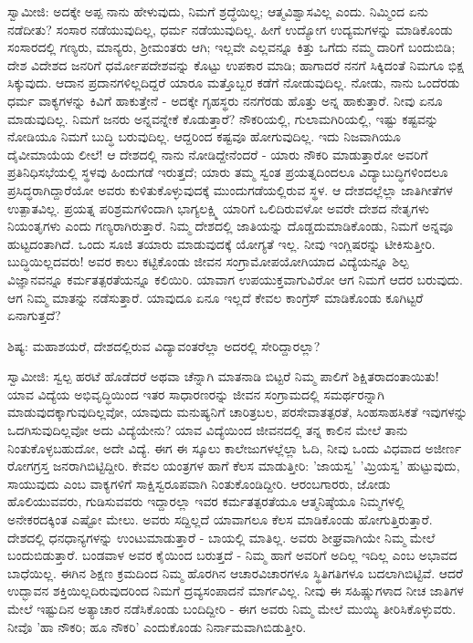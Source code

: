 ಸ್ವಾಮೀಜಿ: ಅದಕ್ಕೇ ಅಪ್ಪ ನಾನು ಹೇಳುವುದು, ನಿಮಗೆ ಶ್ರದ್ಧೆಯಿಲ್ಲ; ಆತ್ಮವಿಶ್ವಾಸವಿಲ್ಲ ಎಂದು. ನಿಮ್ಮಿಂದ ಏನು ನಡೆದೀತು? ಸಂಸಾರ ನಡೆಯುವುದಿಲ್ಲ, ಧರ್ಮ ನಡೆಯುವುದಿಲ್ಲ. ಹೀಗೆ ಉದ್ಯೋಗ ಉದ್ಯಮಗಳನ್ನು ಮಾಡಿಕೊಂಡು ಸಂಸಾರದಲ್ಲಿ ಗಣ್ಯರು, ಮಾನ್ಯರು, ಶ‍್ರೀಮಂತರು ಆಗಿ; ಇಲ್ಲವೇ ಎಲ್ಲವನ್ನೂ ಕಿತ್ತು ಒಗೆದು ನಮ್ಮ ದಾರಿಗೆ ಬಂದುಬಿಡಿ; ದೇಶ ವಿದೇಶದ ಜನರಿಗೆ ಧರ್ಮೋಪದೇಶವನ್ನು ಕೊಟ್ಟು ಉಪಕಾರ ಮಾಡಿ; ಹಾಗಾದರೆ ನನಗೆ ಸಿಕ್ಕಿದಂತೆ ನಿಮಗೂ ಭಿಕ್ಷ ಸಿಕ್ಕುವುದು. ಆದಾನ ಪ್ರದಾನಗಳಿಲ್ಲದಿದ್ದರೆ ಯಾರೂ ಮತ್ತೊಬ್ಬರ ಕಡೆಗೆ ನೋಡುವುದಿಲ್ಲ. ನೋಡು, ನಾನು ಒಂದೆರಡು ಧರ್ಮ ವಾಕ್ಯಗಳನ್ನು ಕಿವಿಗೆ ಹಾಕುತ್ತೇನೆ - ಅದಕ್ಕೇ ಗೃಹಸ್ಥರು ನನಗೆರಡು ಹೊತ್ತು ಅನ್ನ ಹಾಕುತ್ತಾರೆ. ನೀವು ಏನೂ ಮಾಡುವುದಿಲ್ಲ. ನಿಮಗೆ ಜನರು ಅನ್ನವನ್ನೇಕೆ ಕೊಡುತ್ತಾರೆ? ನೌಕರಿಯಲ್ಲಿ, ಗುಲಾಮಗಿರಿಯಲ್ಲಿ, ಇಷ್ಟು ಕಷ್ಟವನ್ನು ನೋಡಿಯೂ ನಿಮಗೆ ಬುದ್ಧಿ ಬರುವುದಿಲ್ಲ. ಆದ್ದರಿಂದ ಕಷ್ಟವೂ ಹೋಗುವುದಿಲ್ಲ. ಇದು ನಿಜವಾಗಿಯೂ ದೈವೀಮಾಯೆಯ ಲೀಲೆ! ಆ ದೇಶದಲ್ಲಿ ನಾನು ನೋಡಿದ್ದೇನೆಂದರೆ - ಯಾರು ನೌಕರಿ ಮಾಡುತ್ತಾರೋ ಅವರಿಗೆ ಪ್ರತಿನಿಧಿಸಭೆಯಲ್ಲಿ ಸ್ಥಳವು ಹಿಂದುಗಡೆ ಇರುತ್ತದೆ; ಯಾರು ತಮ್ಮ ಸ್ವಂತ ಪ್ರಯತ್ನದಿಂದಲೂ ವಿದ್ಯಾಬುದ್ಧಿಗಳಿಂದಲೂ ಪ್ರಸಿದ್ಧರಾಗಿದ್ದಾರೆಯೋ ಅವರು ಕುಳಿತುಕೊಳ್ಳುವುದಕ್ಕೆ ಮುಂದುಗಡೆಯಲ್ಲಿರುವ ಸ್ಥಳ. ಆ ದೇಶದಲ್ಲೆಲ್ಲಾ ಜಾತಿಗೀತೆಗಳ ಉತ್ಪಾತವಿಲ್ಲ. ಪ್ರಯತ್ನ ಪರಿಶ್ರಮಗಳಿಂದಾಗಿ ಭಾಗ್ಯಲಕ್ಷ್ಮಿ ಯಾರಿಗೆ ಒಲಿದಿರುವಳೋ ಅವರೇ ದೇಶದ ನೇತೃಗಳು ನಿಯಂತೃಗಳು ಎಂದು ಗಣ್ಯರಾಗಿರುತ್ತಾರೆ. ನಿಮ್ಮ ದೇಶದಲ್ಲಿ ಜಾತಿಯನ್ನು ದೊಡ್ಡದುಮಾಡಿಕೊಂಡು, ನಿಮಗೆ ಅನ್ನವೂ ಹುಟ್ಟದಂತಾಗಿದೆ. ಒಂದು ಸೂಜಿ ತಯಾರು ಮಾಡುವುದಕ್ಕೆ ಯೋಗ್ಯತೆ ಇಲ್ಲ. ನೀವು ಇಂಗ್ಲಿಷರನ್ನು ಟೀಕಿಸುತ್ತೀರಿ. ಬುದ್ಧಿಯಿಲ್ಲದವರು! ಅವರ ಕಾಲು ಕಟ್ಟಿಕೊಂಡು ಜೀವನ ಸಂಗ್ರಾಮೋಪಯೋಗಿಯಾದ ವಿದ್ಯೆಯನ್ನೂ ಶಿಲ್ಪ ವಿಜ್ಞಾನವನ್ನೂ ಕರ್ಮತತ್ಪರತೆಯನ್ನೂ ಕಲಿಯಿರಿ. ಯಾವಾಗ ಉಪಯುಕ್ತವಾಗುವಿರೋ ಆಗ ನಿಮಗೆ ಆದರ ಬರುವುದು. ಆಗ ನಿಮ್ಮ ಮಾತನ್ನು ನಡೆಸುತ್ತಾರೆ. ಯಾವುದೂ ಏನೂ ಇಲ್ಲದೆ ಕೇವಲ ಕಾಂಗ್ರೆಸ್ ಮಾಡಿಕೊಂಡು ಕೂಗಿಟ್ಟರೆ ಏನಾಗುತ್ತದೆ?

ಶಿಷ್ಯ: ಮಹಾಶಯರೆ, ದೇಶದಲ್ಲಿರುವ ವಿದ್ಯಾವಂತರೆಲ್ಲಾ ಅದರಲ್ಲಿ ಸೇರಿದ್ದಾರಲ್ಲಾ?

ಸ್ವಾಮೀಜಿ: ಸ್ವಲ್ಪ ಹರಟೆ ಹೊಡೆದರೆ ಅಥವಾ ಚೆನ್ನಾಗಿ ಮಾತನಾಡಿ ಬಿಟ್ಟರೆ ನಿಮ್ಮ ಪಾಲಿಗೆ ಶಿಕ್ಷಿತರಾದಂತಾಯಿತು! ಯಾವ ವಿದ್ಯೆಯ ಅಭಿವೃದ್ಧಿಯಿಂದ ಇತರ ಸಾಧಾರಣರನ್ನು ಜೀವನ ಸಂಗ್ರಾಮದಲ್ಲಿ ಸಮರ್ಥರನ್ನಾಗಿ ಮಾಡುವುದಕ್ಕಾಗುವುದಿಲ್ಲವೋ, ಯಾವುದು ಮನುಷ್ಯನಿಗೆ ಚಾರಿತ್ರಬಲ, ಪರಸೇವಾತತ್ಪರತೆ, ಸಿಂಹಸಾಹಸಿಕತೆ ಇವುಗಳನ್ನು ಒದಗಿಸುವುದಿಲ್ಲವೋ ಅದು ವಿದ್ಯೆಯೇನು? ಯಾವ ವಿದ್ಯೆಯಿಂದ ಜೀವನದಲ್ಲಿ ತನ್ನ ಕಾಲಿನ ಮೇಲೆ ತಾನು ನಿಂತುಕೊಳ್ಳಬಹುದೋ, ಅದೇ ವಿದ್ಯೆ. ಈಗ ಈ ಸ್ಕೂಲು ಕಾಲೇಜುಗಳಲ್ಲೆಲ್ಲಾ ಓದಿ, ನೀವು ಒಂದು ವಿಧವಾದ ಅಜೀರ್ಣ ರೋಗಗ್ರಸ್ತ ಜನರಾಗಿಬಿಟ್ಟಿದ್ದೀರಿ. ಕೇವಲ ಯಂತ್ರಗಳ ಹಾಗೆ ಕೆಲಸ ಮಾಡುತ್ತೀರಿ: 'ಜಾಯಸ್ವ' 'ಮ್ರಿಯಸ್ವ' ಹುಟ್ಟುವುದು, ಸಾಯುವುದು ಎಂಬ ವಾಕ್ಯಗಳಿಗೆ ಸಾಕ್ಷಿಸ್ವರೂಪವಾಗಿ ನಿಂತುಕೊಂಡಿದ್ದೀರಿ. ಆರಂಬಗಾರರು, ಜೋಡು ಹೊಲಿಯುವವರು, ಗುಡಿಸುವವರು ಇದ್ದಾರಲ್ಲಾ ಇವರ ಕರ್ಮತತ್ಪರತೆಯೂ ಆತ್ಮನಿಷ್ಠೆಯೂ ನಿಮ್ಮಗಳಲ್ಲಿ ಅನೇಕರದಕ್ಕಿಂತ ಎಷ್ಟೋ ಮೇಲು. ಅವರು ಸದ್ದಿಲ್ಲದೆ ಯಾವಾಗಲೂ ಕೆಲಸ ಮಾಡಿಕೊಂಡು ಹೋಗುತ್ತಿರುತ್ತಾರೆ. ದೇಶದಲ್ಲಿ ಧನಧಾನ್ಯಗಳನ್ನು ಉಂಟುಮಾಡುತ್ತಾರೆ - ಬಾಯಲ್ಲಿ ಮಾತಿಲ್ಲ. ಅವರು ಶೀಘ್ರವಾಗಿಯೇ ನಿಮ್ಮ ಮೇಲೆ ಬಂದುಬಿಡುತ್ತಾರೆ. ಬಂಡವಾಳ ಅವರ ಕೈಯಿಂದ ಬರುತ್ತದೆ - ನಿಮ್ಮ ಹಾಗೆ ಅವರಿಗೆ ಅದಿಲ್ಲ ಇದಿಲ್ಲ ಎಂಬ ಅಭಾವದ ಬಾಧೆಯಿಲ್ಲ. ಈಗಿನ ಶಿಕ್ಷಣ ಕ್ರಮದಿಂದ ನಿಮ್ಮ ಹೊರಗಿನ ಆಚಾರವಿಚಾರಗಳೂ ಸ್ಥಿತಿಗತಿಗಳೂ ಬದಲಾಗಿಬಿಟ್ಟಿವೆ. ಆದರೆ ಉದ್ಭಾವನ ಶಕ್ತಿಯಿಲ್ಲದಿರುವುದರಿಂದ ನಿಮಗೆ ದ್ರವ್ಯಸಂಪಾದನೆ ಮಾರ್ಗವಿಲ್ಲ. ನೀವು ಈ ಸಹಿಷ್ಣುಗಳಾದ ನೀಚ ಜಾತಿಗಳ ಮೇಲೆ ಇಷ್ಟುದಿನ ಅತ್ಯಾಚಾರ ನಡೆಸಿಕೊಂಡು ಬಂದಿದ್ದೀರಿ - ಈಗ ಅವರು ನಿಮ್ಮ ಮೇಲೆ ಮುಯ್ಯಿ ತೀರಿಸಿಕೊಳ್ಳುವರು. ನೀವೊ 'ಹಾ ನೌಕರಿ; ಹೂ ನೌಕರಿ' ಎಂದುಕೊಂಡು ನಿರ್ನಾಮವಾಗಿಬಿಡುತ್ತೀರಿ.

